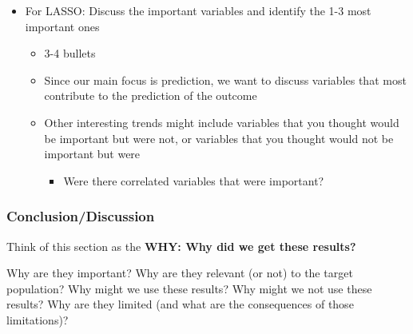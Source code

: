 \documentclass[
  letterpaper,
  DIV=11,
  numbers=noendperiod]{scrartcl}
\providecommand{\tightlist}{%
  \setlength{\itemsep}{0pt}\setlength{\parskip}{0pt}}
\begin{document}
\begin{itemize}
  \begin{itemize}
  \tightlist
  \item
    3-4 bullets
  \item
    Interpreting the explanatory variable's relationship with IAT score
    is the most important thing to report!!

    \begin{itemize}
    \tightlist
    \item
      When doing this, make sure you account for ALL interactions: If
      your explanatory variable has multiple interactions and you are
      trying to interpret one, then what does that mean about the other
      variables involved in the other interactions? If this is
      confusing, please make an appointment with me!!
    \end{itemize}
  \end{itemize}
\item
  {For LASSO:} Discuss the important variables and identify the 1-3 most
  important ones

  \begin{itemize}
  \tightlist
  \item
    3-4 bullets
  \item
    Since our main focus is prediction, we want to discuss variables
    that most contribute to the prediction of the outcome
  \item
    Other interesting trends might include variables that you thought
    would be important but were not, or variables that you thought would
    not be important but were

    \begin{itemize}
    \tightlist
    \item
      Were there correlated variables that were important?
    \end{itemize}
  \end{itemize}
\end{itemize}

\subsubsection{Conclusion/Discussion}\label{conclusiondiscussion}

\begin{tcolorbox}[enhanced jigsaw, arc=.35mm, bottomrule=.15mm, bottomtitle=1mm, breakable, colback=white, colbacktitle=quarto-callout-caution-color!10!white, colframe=quarto-callout-caution-color-frame, coltitle=black, left=2mm, leftrule=.75mm, opacityback=0, opacitybacktitle=0.6, rightrule=.15mm, title=\textcolor{quarto-callout-caution-color}{\faFire}\hspace{0.5em}{Caution}, titlerule=0mm, toprule=.15mm, toptitle=1mm]

Think of this section as the \textbf{WHY: Why did we get these results?}

Why are they important? Why are they relevant (or not) to the target
population? Why might we use these results? Why might we not use these
results? Why are they limited (and what are the consequences of those
limitations)?

\end{tcolorbox}
\end{document}

